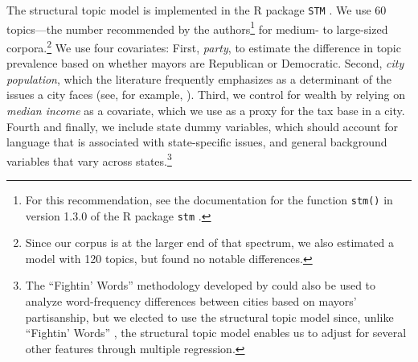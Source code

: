 \documentclass[11pt]{article}
\begin{document}
The structural topic model is implemented in the R package \texttt{STM} \citep{stm}. We use 60 topics---the number recommended by the authors\footnote{For this recommendation, see the documentation for the function \texttt{stm()} in version 1.3.0 of the R package \texttt{stm} \citep{stm}.} for medium- to large-sized corpora.\footnote{Since our corpus is at the larger end of that spectrum, we also estimated a model with 120 topics, but found no notable differences.} We use four covariates: First, \textit{party}, to estimate the difference in topic prevalence based on whether mayors are Republican or Democratic. Second, \textit{city population}, which the literature frequently emphasizes as a determinant of the issues a city faces (see, for example, \cite{Guillamon2013}). Third, we control for wealth by relying on \textit{median income} as a covariate, which we use as a proxy for the tax base in a city. Fourth and finally, we include state dummy variables, which should account for language that is associated with state-specific issues, and general background variables that vary across states.\footnote{The ``Fightin' Words'' methodology developed by \citet{Monroe2008} could also be used to analyze word-frequency differences between cities based on mayors' partisanship, but we elected to use the structural topic model since, unlike ``Fightin' Words'' , the structural topic model enables us to adjust for several other features through multiple regression.} 










\end{document}
